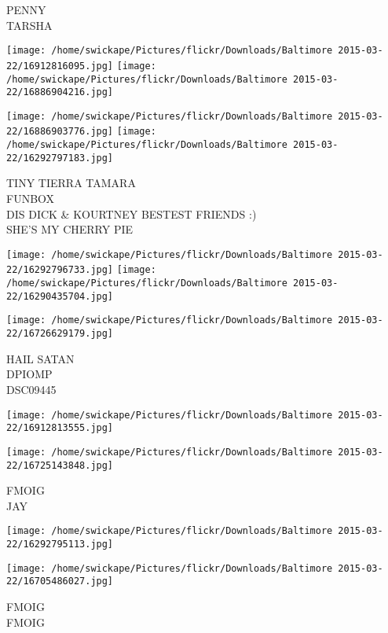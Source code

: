 \documentclass[10pt,letterpaper]{article}
\begin{document}
PENNY\\
TARSHA\\
\pagebreak

\texttt{[image: /home/swickape/Pictures/flickr/Downloads/Baltimore 2015-03-22/16912816095.jpg]}
\texttt{[image: /home/swickape/Pictures/flickr/Downloads/Baltimore 2015-03-22/16886904216.jpg]}

\texttt{[image: /home/swickape/Pictures/flickr/Downloads/Baltimore 2015-03-22/16886903776.jpg]}
\texttt{[image: /home/swickape/Pictures/flickr/Downloads/Baltimore 2015-03-22/16292797183.jpg]}

TINY TIERRA TAMARA\\
FUNBOX\\
DIS DICK \& KOURTNEY BESTEST FRIENDS :)\\
SHE'S MY CHERRY PIE\\
\pagebreak

\texttt{[image: /home/swickape/Pictures/flickr/Downloads/Baltimore 2015-03-22/16292796733.jpg]}
\texttt{[image: /home/swickape/Pictures/flickr/Downloads/Baltimore 2015-03-22/16290435704.jpg]}

\vspace{0.25in}
\texttt{[image: /home/swickape/Pictures/flickr/Downloads/Baltimore 2015-03-22/16726629179.jpg]}

HAIL SATAN\\
DPIOMP\\
DSC09445\\
\pagebreak

\texttt{[image: /home/swickape/Pictures/flickr/Downloads/Baltimore 2015-03-22/16912813555.jpg]}

\vspace{0.25in}
\texttt{[image: /home/swickape/Pictures/flickr/Downloads/Baltimore 2015-03-22/16725143848.jpg]}

FMOIG\\
JAY\\
\pagebreak

\texttt{[image: /home/swickape/Pictures/flickr/Downloads/Baltimore 2015-03-22/16292795113.jpg]}

\vspace{0.25in}
\texttt{[image: /home/swickape/Pictures/flickr/Downloads/Baltimore 2015-03-22/16705486027.jpg]}

FMOIG\\
FMOIG\\
\pagebreak
\end{document}
